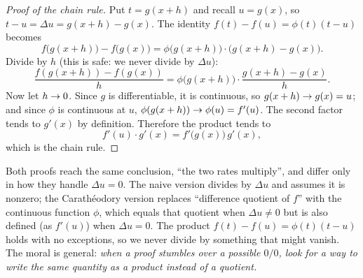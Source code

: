 \begin{proof}[Proof of the chain rule]
Put $t = g(x+h)$ and recall $u = g(x)$, so $t - u = \Delta u = g(x+h)-g(x)$. The identity
$f(t)-f(u)=\phi(t)(t-u)$ becomes
\[
  f\big(g(x+h)\big) - f\big(g(x)\big) = \phi\big(g(x+h)\big)\cdot\big(g(x+h)-g(x)\big).
\]
Divide by $h$ (this is safe: we never divide by $\Delta u$):
\[
  \frac{f(g(x+h)) - f(g(x))}{h}
  = \phi\big(g(x+h)\big)\cdot\frac{g(x+h)-g(x)}{h}.
\]
Now let $h\to 0$. Since $g$ is differentiable, it is continuous, so $g(x+h)\to g(x)=u$;
and since $\phi$ is continuous at $u$, $\phi(g(x+h))\to \phi(u) = f'(u)$. The second factor
tends to $g'(x)$ by definition. Therefore the product tends to
\[
  f'(u)\cdot g'(x) = f'\big(g(x)\big)\,g'(x),
\]
which is the chain rule.
\end{proof}

\begin{whybox}
Both proofs reach the same conclusion, ``the two rates
multiply'', and differ only in how they handle $\Delta u = 0$. The naive version divides by $\Delta u$ and
assumes it is nonzero; the Carath\'eodory version replaces ``difference quotient of $f$''
with the continuous function $\phi$, which equals that quotient when $\Delta u
\ne 0$ but is also defined (as $f'(u)$) when $\Delta u = 0$. The product
$f(t)-f(u)=\phi(t)(t-u)$ holds with no exceptions, so we never divide by something that
might vanish. The moral is general: \emph{when a proof stumbles over a possible $0/0$,
look for a way to write the same quantity as a product instead of a quotient.}
\end{whybox}


